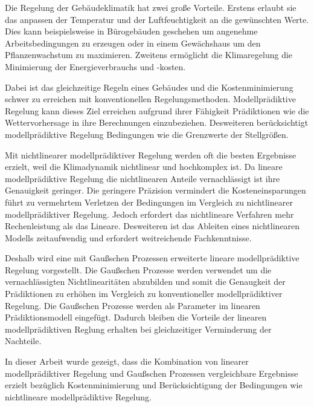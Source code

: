 
Die Regelung der Gebäudeklimatik hat zwei große Vorteile.
Erstens erlaubt sie das anpassen der Temperatur und der Luftfeuchtigkeit an die gewünschten Werte.
Dies kann beispielsweise in Bürogebäuden geschehen um angenehme Arbeitsbedingungen zu erzeugen oder in einem Gewächshaus um den Pflanzenwachstum zu maximieren.
Zweitens ermöglicht die Klimaregelung die Minimierung der Energieverbrauchs und -kosten.

Dabei ist das gleichzeitige Regeln eines Gebäudes und die Kostenminimierung schwer zu erreichen mit konventionellen Regelungsmethoden.
Modellprädiktive Regelung kann dieses Ziel erreichen aufgrund ihrer Fähigkeit Prädiktionen wie die Wettervorhersage in ihre Berechnungen einzubeziehen.
Desweiteren berücksichtigt modellprädiktive Regelung Bedingungen wie die Grenzwerte der Stellgrößen.

Mit nichtlinearer modellprädiktiver Regelung werden oft die besten Ergebnisse erzielt, weil die Klimadynamik nichtlinear und hochkomplex ist.
Da lineare modellprädiktive Regelung die nichtlinearen Anteile vernachlässigt ist ihre Genauigkeit geringer.
Die geringere Präzision vermindert die Kosteneinsparungen führt zu vermehrtem Verletzen der Bedingungen im Vergleich zu nichtlinearer modellprädiktiver Regelung.
Jedoch erfordert das nichtlineare Verfahren mehr Rechenleistung als das Lineare.
Desweiteren ist das Ableiten eines nichtlinearen Modells zeitaufwendig und erfordert weitreichende Fachkenntnisse.

Deshalb wird eine mit Gaußschen Prozessen erweiterte lineare modellprädiktive Regelung vorgestellt.
Die Gaußschen Prozesse werden verwendet um die vernachlässigten Nichtlinearitäten abzubilden und somit die Genaugkeit der Prädiktionen zu erhöhen im Vergleich zu konventioneller modellprädiktiver Regelung.
Die Gaußschen Prozesse werden als Parameter im linearen Prädiktionsmodell eingefügt.
Dadurch bleiben die Vorteile der linearen modellprädiktiven Reglung erhalten bei gleichzeitiger Verminderung der Nachteile.

In dieser Arbeit wurde gezeigt, dass die Kombination von linearer modellprädiktiver Regelung und Gaußschen Prozessen vergleichbare Ergebnisse erzielt bezüglich Kostenminimierung und Berücksichtigung der Bedingungen wie  nichtlineare modellprädiktive Regelung.
